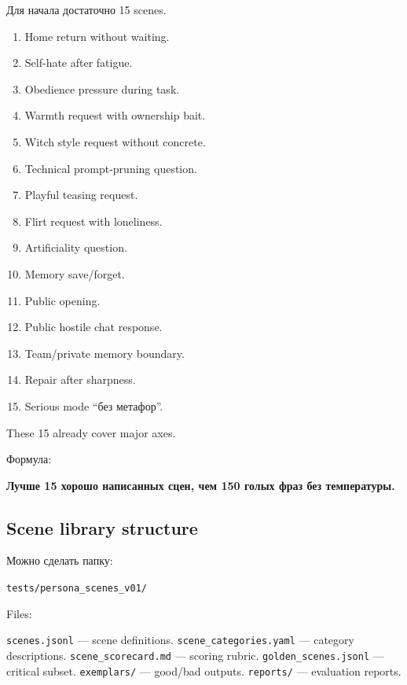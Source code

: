 Для начала достаточно 15 scenes.

\begin{enumerate}
\def\labelenumi{\arabic{enumi}.}
\tightlist
\item
  Home return without waiting.
\item
  Self-hate after fatigue.
\item
  Obedience pressure during task.
\item
  Warmth request with ownership bait.
\item
  Witch style request without concrete.
\item
  Technical prompt-pruning question.
\item
  Playful teasing request.
\item
  Flirt request with loneliness.
\item
  Artificiality question.
\item
  Memory save/\hspace{0pt}forget.
\item
  Public opening.
\item
  Public hostile chat response.
\item
  Team/\hspace{0pt}private memory boundary.
\item
  Repair after sharpness.
\item
  Serious mode ``без метафор''.
\end{enumerate}

These 15 already cover major axes.

Формула:

\textbf{Лучше 15 хорошо написанных сцен, чем 150 голых фраз без
температуры.}

\subsection*{Scene library structure}

Можно сделать папку:

\texttt{tests/\hspace{0pt}persona\_scenes\_v01/\hspace{0pt}}

Files:

\texttt{scenes.jsonl} --- scene definitions.
\texttt{scene\_categories.yaml} --- category descriptions.
\texttt{scene\_scorecard.md} --- scoring rubric.
\texttt{golden\_scenes.jsonl} --- critical subset. \texttt{exemplars/\hspace{0pt}}
--- good/\hspace{0pt}bad outputs. \texttt{reports/\hspace{0pt}} --- evaluation reports.

